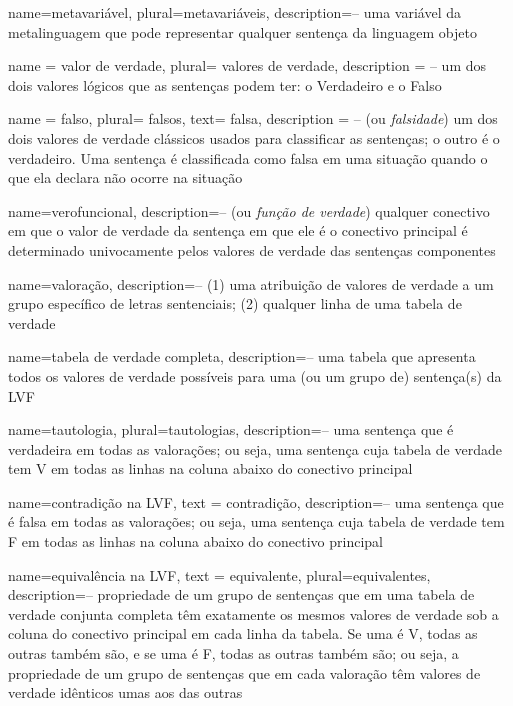 {
 name=metavariável,
 plural=metavariáveis,
 description={-- uma variável da metalinguagem que pode representar qualquer sentença da linguagem objeto}
}

{
 name = valor de verdade,
 plural= valores de verdade,
 description = {-- um dos dois valores lógicos que as sentenças podem ter: o Verdadeiro e o Falso}
}

{
 name = falso,
 plural= falsos,
 text= falsa,
 description = {-- (ou \textit{falsidade}) um dos dois valores de verdade clássicos usados para classificar as sentenças; o outro é o verdadeiro. Uma sentença é classificada como falsa em uma situação quando o que ela declara não ocorre na situação}
}

{
 name=verofuncional,
 description={-- (ou \textit{função de verdade}) qualquer conectivo em que o valor de verdade da sentença em que ele é o conectivo principal é determinado univocamente pelos valores de verdade das sentenças componentes}
}

{
 name=valoração,
 description={-- (1) uma atribuição de valores de verdade a um grupo específico de letras sentenciais; (2) qualquer linha de uma tabela de verdade}
}

{
 name=tabela de verdade completa,
 description={-- uma tabela que apresenta todos os valores de verdade possíveis para uma (ou um grupo de) sentença(s) da LVF}
}

{
 name=tautologia,
 plural=tautologias,
 description={-- uma sentença que é verdadeira em todas as valorações; ou seja, uma sentença cuja tabela de verdade tem V em todas as linhas na coluna abaixo do conectivo principal}
}

{
 name=contradição na LVF,
 text = contradição,
 description={-- uma sentença que é falsa em todas as valorações; ou seja, uma sentença cuja tabela de verdade tem F em todas as linhas na coluna abaixo do conectivo principal}
}

{
 name=equivalência na LVF,
 text = equivalente,
 plural=equivalentes,
 description={-- propriedade de um grupo de sentenças que em uma tabela de verdade conjunta completa têm exatamente os mesmos valores de verdade sob a coluna do conectivo principal em cada linha da tabela. Se uma é V, todas as outras também são, e se uma é F, todas as outras também são; ou seja, a propriedade de um grupo de sentenças que em cada valoração têm valores de verdade idênticos umas aos das outras}
}

